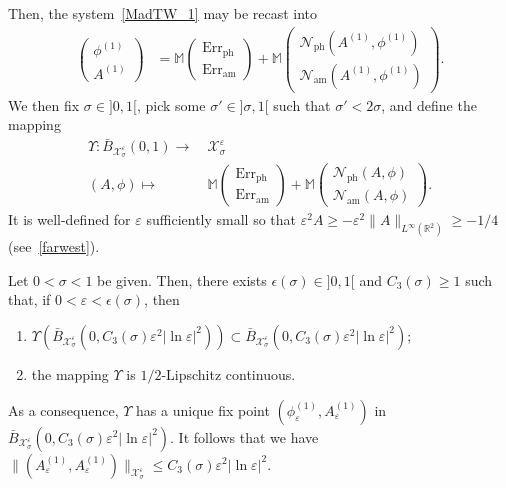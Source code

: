 \documentclass[10pt]{amsart}
\theoremstyle{definition}\newtheorem{defi}[theo]{Definition}\newtheorem{rema}[theo]{Remark}\newtheorem{exam}[theo]{Example}\newtheorem{exem}[theo]{Example}\newtheorem{nota}[theo]{Notation}
\newcommand*\R{\mathbb R}
\newcommand{\bbM}{\mathbb{M}}
\newcommand{\amm}{\mathrm{am}}
\newcommand{\phl}{\mathrm{ph}}
\newcommand{\Err}{\mathrm{Err}}
\newcommand*\BN{\mathcal{N}}
\newcommand*\BX{\mathcal{X}}
\newcommand*\ii{\infty}
\newcommand*\gs{\geqslant }
\newcommand*\ls{\leqslant }
\newcommand*\e{\varepsilon}
\newcommand*\ep{\epsilon}
\newcommand*\lne{\lvert \ln \varepsilon \rvert}
\newcommand*\s{\sigma}
\newcommand*{\romanenumi}{\renewcommand*{\theenumi}{\roman{enumi}}}
\begin{document}
Then, the system~\eqref{MadTW_1} may be recast into
\begin{align}\label{patafix}
\begin{pmatrix}
\phi^{(1)} \\ A^{(1)}
\end{pmatrix}
& = \bbM
\begin{pmatrix}
{\Err}_{\phl} \\ {\Err}_{\amm}
\end{pmatrix}
+ \bbM
\begin{pmatrix}
\BN_{{\phl}} \left(A^{(1)}, \phi^{(1)}\right) \\ \BN_{{\amm} } \left(A^{(1)}, \phi^{(1)}\right)
\end{pmatrix}.
\end{align}
We then fix $ \s \in]0,1 [$, pick some $ \s' \in] \s, 1 [$ such that $ \s' < 2\s $, and define the mapping
\begin{align*}
\Upsilon : \bar{B}_{ \BX^\e_{\s} } (0, 1) \to & \ \BX^\e_{\s }
\\ (A, \phi) \mapsto & \
\bbM
\begin{pmatrix}
{\Err}_{\phl} \\ {\Err}_{\amm}
\end{pmatrix}
+ \bbM
\begin{pmatrix}
\BN_{{\phl} } (A, \phi) \\ \BN_{{\amm} } (A, \phi)
\end{pmatrix}.
\end{align*}
It is well-defined for $\e $ sufficiently small so that $ \e^2 A \gs - \e^2 \| A \|_{L^\ii(\R^2)}
\gs -1/4 $ (see~\eqref{farwest}).


\begin{prop}\label{contraction}
Let $ 0 < \s < 1 $ be given. Then, there exists $ \ep (\s) \in]0,1[$ and $ C_3 (\s) \gs 1 $ such that, if $ 0 < \e < \ep(\s) $, then
\begin{enumerate}\romanenumi
\item\label{prop2.11.1} $ \Upsilon (\bar{B}_{ \BX^\e_{\s} } (0, C_3 (\s) \e^2 \lne^2) )
\subset \bar{B}_{ \BX^\e_{\s} } (0, C_3 (\s) \e^2 \lne^2 ) $;

\item\label{prop2.11.2} the mapping $ \Upsilon $ is $1/2$-Lipschitz continuous.
\end{enumerate}
As a consequence, $\Upsilon $ has a unique fix point $ (\phi^{(1)}_\e, A^{(1)}_\e) $ in $ \bar{B}_{ \BX^\e_{\s} } (0, C_3 (\s) \e^2 \lne^2) $. It follows that we have $ \| (A^{(1)}_\e, A^{(1)}_\e) \|_{ \BX^\e_{\s} } \ls C_3 (\s) \e^2 \lne^2 $.
\end{prop}
\end{document}

